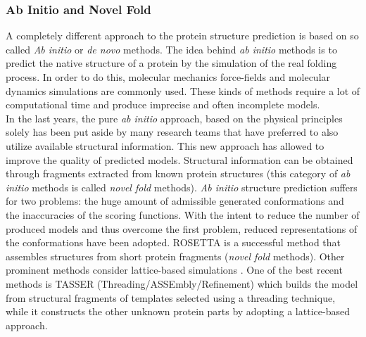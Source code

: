 \subsubsection{Ab Initio and Novel Fold}
\label{subsubsec:ab_initio_and_novel_fold}
A completely different approach to the protein structure prediction is based on so called \emph{Ab initio} or \emph{de novo} methods. The idea behind \emph{ab initio} methods is to predict the native structure of a protein by the simulation of the real folding process. In order to do this, molecular mechanics force-fields and molecular dynamics simulations are commonly used. These kinds of methods require a lot of computational time and produce imprecise and often incomplete models.\\
In the last years, the pure \emph{ab initio} approach, based on the physical principles solely has been put aside by many research teams that have preferred to also utilize available structural information. This new approach has allowed to improve the quality of predicted models. Structural information can be obtained through fragments extracted from known protein structures (this category of \emph{ab initio} methods is called \emph{novel fold} methods). \emph{Ab initio} structure prediction suffers for two problems: the huge amount of admissible generated conformations and the inaccuracies of the scoring functions. With the intent to reduce the number of produced models and thus overcome the first problem, reduced representations of the conformations have been adopted. ROSETTA \cite{Bonneau2002aa, Simons1997aa} is a successful method that assembles structures from short protein fragments (\emph{novel fold} methods). Other prominent methods consider lattice-based simulations \cite{Ortiz1999aa, Zhang2003aa}. One of the best recent methods is TASSER (Threading/ASSEmbly/Refinement) \cite{Zhang2005aa} which builds the model from structural fragments of templates selected using a threading technique, while it constructs the other unknown protein parts by adopting a lattice-based approach.


